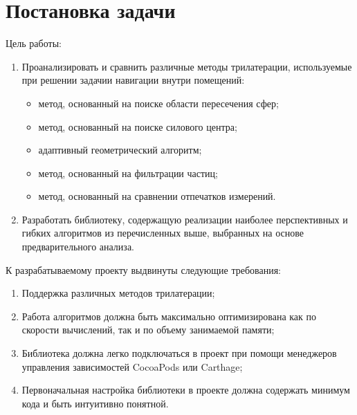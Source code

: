 \section{Постановка задачи}

Цель работы:
\begin{enumerate}
    \item
    Проанализировать и сравнить различные методы трилатерации, ис\-поль\-зу\-емые при решении задачии навигации внутри помещений:
    \begin{itemize}
        \item
        метод, основанный на поиске области пересечения сфер;
        \item
        метод, основанный на поиске силового центра;
        \item
        адаптивный геометрический алгоритм;
        \item
        метод, основанный на фильтрации частиц;
        \item
        метод, основанный на сравнении отпечатков измерений.
    \end{itemize}
    \item
    Разработать библиотеку, содержащую реализации наиболее перспективных и гибких алгоритмов из перечисленных выше, выбранных на основе предварительного анализа.
\end{enumerate}

К разрабатываемому проекту выдвинуты следующие требования:
\begin{enumerate}
    \item
    Поддержка различных методов трилатерации;
    \item
    Работа алгоритмов должна быть максимально оптимизирована как по скорости вычислений, так и по объему занимаемой памяти;
    \item
    Библиотека должна легко подключаться в проект при помощи менеджеров управления зависимостей CocoaPods или Carthage;
    \item
    Первоначальная настройка библиотеки в проекте должна содержать минимум кода и быть интуитивно понятной.
\end{enumerate}